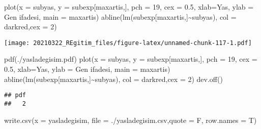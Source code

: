\documentclass[
]{book}
\newenvironment{Shaded}{\begin{snugshade}}{\end{snugshade}}
\newcommand{\AttributeTok}[1]{\textcolor[rgb]{0.77,0.63,0.00}{#1}}
\newcommand{\DecValTok}[1]{\textcolor[rgb]{0.00,0.00,0.81}{#1}}
\newcommand{\FloatTok}[1]{\textcolor[rgb]{0.00,0.00,0.81}{#1}}
\newcommand{\FunctionTok}[1]{\textcolor[rgb]{0.00,0.00,0.00}{#1}}
\newcommand{\NormalTok}[1]{#1}
\newcommand{\SpecialCharTok}[1]{\textcolor[rgb]{0.00,0.00,0.00}{#1}}
\newcommand{\StringTok}[1]{\textcolor[rgb]{0.31,0.60,0.02}{#1}}
\begin{document}
\begin{Shaded}
\begin{Highlighting}[]
\FunctionTok{plot}\NormalTok{(}\AttributeTok{x =}\NormalTok{ subyas, }\AttributeTok{y =}\NormalTok{ subexp[maxartis,], }\AttributeTok{pch =} \DecValTok{19}\NormalTok{, }\AttributeTok{cex =} \FloatTok{0.5}\NormalTok{, }\AttributeTok{xlab=}\StringTok{\textquotesingle{}Yas\textquotesingle{}}\NormalTok{,}
     \AttributeTok{ylab =} \StringTok{\textquotesingle{}Gen ifadesi\textquotesingle{}}\NormalTok{, }\AttributeTok{main =}\NormalTok{ maxartis)}
\FunctionTok{abline}\NormalTok{(}\FunctionTok{lm}\NormalTok{(subexp[maxartis,]}\SpecialCharTok{\textasciitilde{}}\NormalTok{subyas), }\AttributeTok{col =} \StringTok{\textquotesingle{}darkred\textquotesingle{}}\NormalTok{,}\AttributeTok{cex =} \DecValTok{2}\NormalTok{)}
\end{Highlighting}
\end{Shaded}

\texttt{[image: 20210322\_REgitim\_files/figure-latex/unnamed-chunk-117-1.pdf]}

\begin{Shaded}
\begin{Highlighting}[]
\FunctionTok{pdf}\NormalTok{(}\StringTok{\textquotesingle{}./yasladegisim.pdf\textquotesingle{}}\NormalTok{)}
\FunctionTok{plot}\NormalTok{(}\AttributeTok{x =}\NormalTok{ subyas, }\AttributeTok{y =}\NormalTok{ subexp[maxartis,], }\AttributeTok{pch =} \DecValTok{19}\NormalTok{, }\AttributeTok{cex =} \FloatTok{0.5}\NormalTok{, }\AttributeTok{xlab=}\StringTok{\textquotesingle{}Yas\textquotesingle{}}\NormalTok{,}
     \AttributeTok{ylab =} \StringTok{\textquotesingle{}Gen ifadesi\textquotesingle{}}\NormalTok{, }\AttributeTok{main =}\NormalTok{ maxartis)}
\FunctionTok{abline}\NormalTok{(}\FunctionTok{lm}\NormalTok{(subexp[maxartis,]}\SpecialCharTok{\textasciitilde{}}\NormalTok{subyas), }\AttributeTok{col =} \StringTok{\textquotesingle{}darkred\textquotesingle{}}\NormalTok{,}\AttributeTok{cex =} \DecValTok{2}\NormalTok{)}
\FunctionTok{dev.off}\NormalTok{()}
\end{Highlighting}
\end{Shaded}

\begin{verbatim}
## pdf 
##   2
\end{verbatim}

\begin{Shaded}
\begin{Highlighting}[]
\FunctionTok{write.csv}\NormalTok{(}\AttributeTok{x =}\NormalTok{ yasladegisim, }\AttributeTok{file =} \StringTok{\textquotesingle{}./yasladegisim.csv\textquotesingle{}}\NormalTok{,}\AttributeTok{quote =}\NormalTok{ F,}
          \AttributeTok{row.names =}\NormalTok{ T)}
\end{Highlighting}
\end{Shaded}
\end{document}

